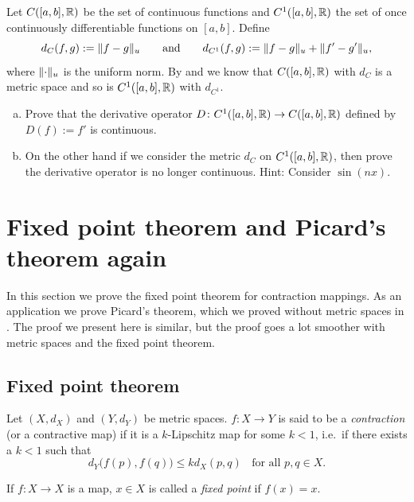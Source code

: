 \begin{samepage}
\begin{exercise}
Let $C([a,b],{\mathbb{R}})$ be the set of continuous functions and
$C^1([a,b],{\mathbb{R}})$ the set of once continuously differentiable
functions on $[a,b]$.
Define
\begin{equation*}
d_{C}(f,g) := \lVert {f-g} \rVert_u
\qquad \text{and} \qquad
d_{C^1}(f,g) := \lVert {f-g} \rVert_u + \lVert {f'-g'} \rVert_u,
\end{equation*}
where $\lVert {\cdot} \rVert_u$ is the uniform norm.
By  and  we know that
$C([a,b],{\mathbb{R}})$ with $d_C$ is a metric space and
so is
$C^1([a,b],{\mathbb{R}})$ with $d_{C^1}$.
\begin{enumerate}[a)]
\item
Prove that the derivative operator $D \colon 
C^1([a,b],{\mathbb{R}}) \to C([a,b],{\mathbb{R}})$ defined by
$D(f) := f'$ is continuous.
\item
On the other hand if we consider the metric $d_C$ on $C^1([a,b],{\mathbb{R}})$,
then prove the derivative operator is no longer continuous.  Hint: Consider
$\sin(n x)$.
\end{enumerate}
\end{exercise}
\end{samepage}


\sectionnewpage
\section{Fixed point theorem and Picard's theorem again}
\label{sec:metpicard}


In this section we prove the fixed point theorem for contraction
mappings.  As an application we prove Picard's theorem, which we proved
without metric spaces in .
The proof we present here is similar, but the proof goes a lot
smoother with metric spaces and the fixed point theorem.

\subsection{Fixed point theorem}

\begin{defn}
Let $(X,d_X)$ and $(Y,d_Y)$ be metric spaces.
$f \colon X \to Y$ is said to be a \emph{contraction}
(or a contractive map) if it is
a $k$-Lipschitz map for some $k < 1$, i.e.\ if there exists a $k < 1$ such that
\begin{equation*}
d_Y\bigl(f(p),f(q)\bigr) \leq k d_X(p,q)
\ \ \ \ \text{for all } p,q \in X.
\end{equation*}

\medskip

If $f \colon X \to X$ is a map, $x \in X$ is called a \emph{fixed point}
if $f(x)=x$.
\end{defn}

